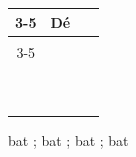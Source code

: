 \documentclass[main.tex]{subfiles}
\begin{document}
\begin{tabular}{|*5{c|}}
	\cline{3-5}
	\multicolumn{2}{c|}{\multirow{2}{*}{}} & \multicolumn{3}{l|}{Dé  }  \\ \cline{3-5}
	\multicolumn{2}{c|}{}   &  \rule{0pt}{1.em}\rule{0.8em}{0pt} &  \rule{0pt}{1.em} \rule{0.8em}{0pt} &\rule{0pt}{1.em}\rule{0.9em}{0pt}    \\ \hline
	\multirow{3}{*}{\rotatebox[origin=c]{90}{Dé \qquad}}	  
	& \rule{0pt}{1.0em}\rule{1.em}{0pt}   &    &   &   \\ \cline{2-5}
	& \rule{0pt}{1.0em}  &   &    &   \\ \cline{2-5} 
	& \rule{0pt}{1.0em}  &   &   &     \\ \hline
\end{tabular}   

\null\hfill bat \hfill ;
\hfill bat \hfill ;
\hfill bat \hfill ;
\hfill bat \hfill \null \smallskip
 
		
		
		
		
		
		
		
		
		 


%	 
\newpage
\end{document}
